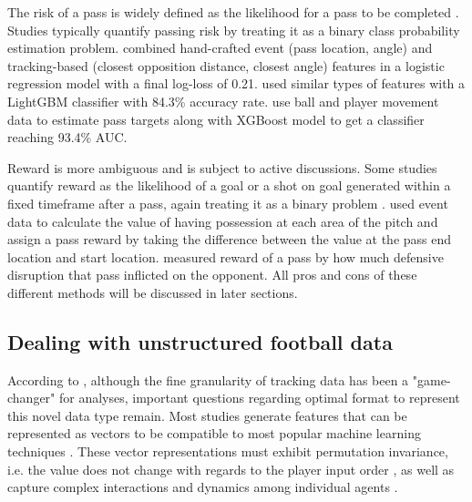 \documentclass[conference]{IEEEtran}
\begin{document}
The risk of a pass is widely defined as the likelihood for a pass to be completed \parencite{xPass2022, riskrewardpower, spearman2017physics, goesriskreward}. Studies typically quantify passing risk by treating it as a binary class probability estimation problem. \textcite{riskrewardpower} combined hand-crafted event (pass location, angle) and tracking-based (closest opposition distance, closest angle) features in a logistic regression model with a final log-loss of 0.21. \textcite{goesriskreward} used similar types of features with a LightGBM classifier with 84.3\% accuracy rate. \textcite{xPass2022} use ball and player movement data to estimate pass targets along with XGBoost model to get a classifier reaching 93.4\% AUC. 

Reward is more ambiguous and is subject to active discussions. Some studies quantify reward as the likelihood of a goal or a shot on goal generated within a fixed timeframe after a pass, again treating it as a binary problem \parencite{goesriskreward,fernandez2019decomposing}. \textcite{qpass} used event data to calculate the value of having possession at each area of the pitch and assign a pass reward by taking the difference between the value at the pass end location and start location. \textcite{goespassassist} measured reward of a pass by how much defensive disruption that pass inflicted on the opponent. All pros and cons of these different methods will be discussed in later sections.







\subsection{Dealing with unstructured football data}\label{bgunstr}

According to \textcite{gnn_framework}, although the fine granularity of tracking data has been a "game-changer" for analyses, important questions regarding optimal format to represent this novel data type remain. Most studies generate features that can be represented as vectors to be compatible to most popular machine learning techniques \parencite{gnn_overall, GNNPaulPower}. These vector representations must exhibit permutation invariance, i.e. the value does not change with regards to the player input order \parencite{gnn_framework}, as well as capture complex interactions and dynamics among individual agents \parencite{kipf2018neural}.
\end{document}
